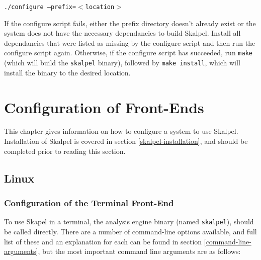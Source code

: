 \documentclass{report}
\begin{document}
\texttt{./configure --prefix=$<$location$>$}

If the configure script fails, either the prefix directory doesn't
already exist or the system does not have the necessary dependancies
to build Skalpel. Install all dependancies that were listed as missing
by the configure script and then run the configure script
again. Otherwise, if the configure script has succeeded, run
\texttt{make} (which will build the \texttt{skalpel} binary), followed
by \texttt{make install}, which will install the binary to the desired
location.


\chapter{Configuration of Front-Ends}

This chapter gives information on how to configure a system to use
Skalpel. Installation of Skalpel is covered in section
\ref{skalpel-installation}, and should be completed prior to reading
this section.

\section{Linux}

\subsection{Configuration of the Terminal Front-End}

To use Skapel in a terminal, the analysis engine binary (named
\texttt{skalpel}), should be called directly. There are a number of
command-line options available, and full list of these and an
explanation for each can be found in section
\ref{command-line-arguments}, but the most important command line
arguments are as follows:
\end{document}
